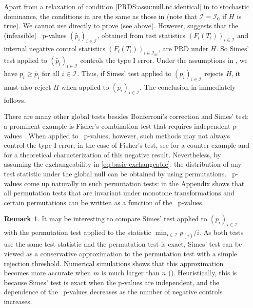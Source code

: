 \documentclass[a4paper,11pt]{article}
\theoremstyle{plain}
\theoremstyle{definition}
\newtheorem{remark}{Remark}
\def\calI{\mathcal{I}}
\theoremstyle{plain}
\newcommand{\No}{{n}}
\newcommand{\NoNc}{m}
\newcommand{\pval}[1]{{p_{#1}}}
\newcommand{\testStatistics}[1]{{T_{#1}}}
\newcommand{\cdfTestStatistics}[1]{{F_{#1}}}
\newcommand{\nickname}{{\text{RANC}}}
\newcommand{\hypothesis}[1]{{H_{#1}}}
\newcommand{\hypothesisIndex}[1]{{\calI_{#1}}}
\begin{document}
Apart from a relaxation of condition
\ref{PRDS:assu:null.nc.identical} in  to stochastic
dominance, the conditions in  are the same as those
in  (note that $\hypothesisIndex{} =
\hypothesisIndex{0}$ if $\hypothesis{}$ is true). We cannot
use  directly to prove
 (see  above). However,
 suggests that the (infeasible) \nickname~p-values
$(\tilde{\pval{i}})_{i \in \hypothesisIndex{}}$, obtained
from test statistics $(\cdfTestStatistics{i}(\testStatistics{i}))_{i \in
    \hypothesisIndex{}}$ and internal negative control statistics
  $(\cdfTestStatistics{i}(\testStatistics{i}))_{i \in
    \hypothesisIndex{\text{nc}}}$, are PRD under $H$. So Simes' test
  applied to $(\tilde{\pval{i}})_{i \in
    \hypothesisIndex{}}$ controls the type I error. Under the
  assumptions in , we have $\pval{i} \geq
  \tilde{\pval{i}}$ for all $i \in \hypothesisIndex{}$. Thus, if Simes'
  test applied to $(\pval{i})_{i \in \hypothesisIndex{}}$ rejects $H$,
  it must also reject $H$ when applied to $(\tilde{\pval{i}})_{i \in
    \hypothesisIndex{}}$. The conclusion in 
  immediately follows.

There are many other global tests besides Bonferroni's correction and Simes'
test; a prominent example is Fisher's combination test that requires
independent p-values \cite{fisher1925statistical}. When applied to
\nickname~p-values, however, such methods may not always control the
type I error; in the case of Fisher's test, see
 for a counter-example and
\textcite[sec.\ 2.1]{bates21_testin_outlier_with_confor_p_values} for
a theoretical characterization of this negative result.
Nevertheless, by assuming the exchangeability in
\eqref{eq:basic-exchangeable}, the distribution of any test statistic
under the global null
can be obtained by using permutations. \nickname~p-values come up
naturally in such permutation tests:  in the
Appendix shows that all permutation tests that are invariant under
monotone transformations and certain permutations can be written as a
function of the \nickname~p-values.

\begin{remark}
It may be interesting to compare Simes' test applied to $(\pval{i})_{i
  \in \hypothesisIndex{}}$ with the permutation test applied to the
statistic $\min_{i \in \hypothesisIndex{}} \pval{(i)}/i$. As both
tests use the same test statistic and the permutation test is exact,
Simes' test can be viewed as a conservative approximation to the
permutation test with a simple rejection threshold. Numerical
simulations shows that this approximation
becomes more accurate when $\NoNc$ is much larger than
$\No$ (). Heuristically, this is because Simes' test is exact when the
p-values are independent, and the dependence of the \nickname~p-values
decreases as the number of negative controls increases.
\end{remark}
\end{document}
